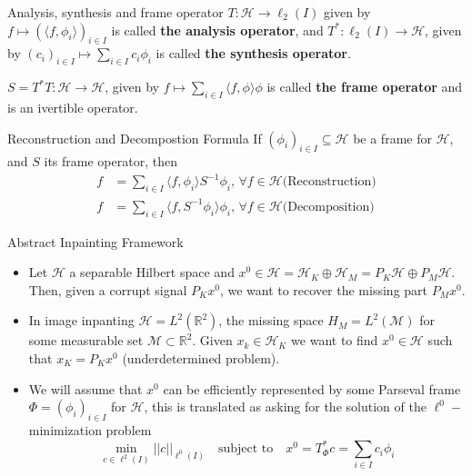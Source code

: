\begin{frame}
\begin{block}{Analysis, synthesis and frame operator}
$T:\mathcal{H}\longrightarrow\ell_2(I)$ given by $f\mapsto (\langle f,\phi_i\rangle )_{i\in I}$ is called \textbf{the analysis operator}, and $T^*:\ell_2(I)\longrightarrow\mathcal{H}$, given by $(c_i)_{i\in I}\mapsto \sum_{i\in I}c_i\phi_i$ is called \textbf{the synthesis operator}.

$S=T^*T:\mathcal{H}\longrightarrow \mathcal{H}$, given by $f\mapsto \sum_{i\in I}\langle f,\phi\rangle \phi$ is called \textbf{the frame operator} and is an ivertible operator. 
\end{block}

\pause
\begin{block}{Reconstruction and Decompostion Formula}
If $(\phi_i)_{i\in I}\subseteq \mathcal{H}$ be a frame for $\mathcal{H}$, and $S$ its frame operator, then
$$
\begin{aligned}
f &=\sum_{i\in I}\langle f,\phi_i\rangle S^{-1}\phi_i \text{,  }\forall f\in\mathcal{H}\text{(Reconstruction)}\\
f &=\sum_{i\in I}\langle f,S^{-1}\phi_i\rangle\phi_i \text{,  }\forall f\in\mathcal{H}\text{(Decomposition)}
\end{aligned}
$$
\end{block}
\end{frame}

\begin{frame}{Abstract Inpainting Framework}
\begin{block}{}
\begin{itemize}
\item Let $\mathcal{H}$ a separable Hilbert space and $x^0\in\mathcal{H}=\mathcal{H}_K\oplus\mathcal{H}_M=P_K\mathcal{H}\oplus P_M\mathcal{H}$. Then, given a corrupt signal $P_K x^0$, we want to recover the missing part $P_Mx^0$.
\bigskip
\pause
\item In image inpanting $\mathcal{H}=L^2(\mathbb{R}^2)$, the missing space $H_M=L^2(\mathcal{M})$ for some measurable set $\mathcal{M}\subset \mathbb{R}^2$. Given $x_k\in \mathcal{H}_K$ we want to find $x^0\in\mathcal{H}$ such that $x_K=P_Kx^0$ (underdetermined problem).
\bigskip
\pause
\item We will assume that $x^0$ can be efficiently represented by some Parseval frame $\Phi=(\phi_i)_{i\in I}$ for $\mathcal{H}$, this is translated as asking for the solution of the $\ell^0-$minimization problem
$$
\underset{c\in\ell^2(I)}{\min}||c||_{\ell^0(I)}\quad\textrm{subject to}\quad x^0=T_{\Phi}^*c=\sum_{i\in I}c_i\phi_i
$$
\end{itemize}
\end{block}
\end{frame}

